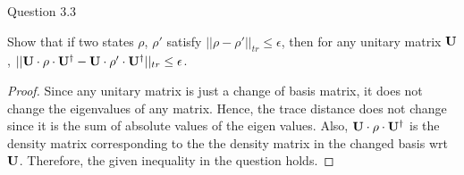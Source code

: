 \begin{solution}{Question 3.3}\label{ques:33}
    \begin{question}
        Show that if two states $\rho$, $\rho'$ satisfy $||\rho - \rho'||_{tr} \leq \epsilon$, then for any unitary matrix $\mathbf{U}$, $||\mathbf{U}\cdot\rho\cdot\mathbf{U}^\dagger - \mathbf{U}\cdot\rho'\cdot\mathbf{U}^\dagger||_{tr} \leq \epsilon$.
    \end{question}
    \tcblower{}
    \begin{proof}
        Since any unitary matrix is just a change of basis matrix, it does not change the eigenvalues of any matrix. Hence, the trace distance does not change since it is the sum of absolute values of the eigen values. Also, $\mathbf{U}\cdot\rho\cdot\mathbf{U}^\dagger$ is the density matrix corresponding to the the density matrix in the changed basis wrt $\mathbf{U}$. Therefore, the given inequality in the question holds.
    \end{proof}
\end{solution}
